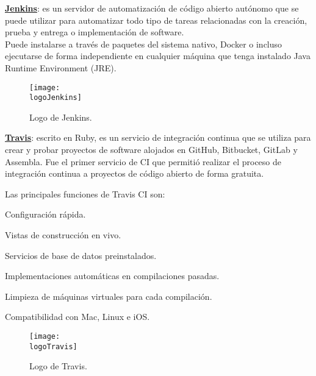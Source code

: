 \begin{compactitem}
    \item \textbf{\underline{Jenkins}}: es un servidor de automatización de código abierto autónomo que se puede utilizar para automatizar todo tipo de tareas relacionadas con la creación, prueba y entrega o implementación de software.\\
    Puede instalarse a través de paquetes del sistema nativo, Docker o incluso ejecutarse de forma independiente en cualquier máquina que tenga instalado Java Runtime Environment (JRE).
    \begin{figure}[h]
        \centering
        \texttt{[image: \\logoJenkins]}
        \caption{Logo de Jenkins.}
    \end{figure}
    \item \textbf{\underline{Travis}}: escrito en Ruby, es un servicio de integración continua que se utiliza para crear y probar proyectos de software alojados en GitHub, Bitbucket, GitLab y Assembla. Fue el primer servicio de CI que permitió realizar el proceso de integración continua a proyectos de código abierto de forma gratuita.
    
    Las principales funciones de Travis CI son:
    \begin{compactitem}
        \item Configuración rápida.
        \item Vistas de construcción en vivo.
        \item Servicios de base de datos preinstalados.
        \item Implementaciones automáticas en compilaciones pasadas.
        \item Limpieza de máquinas virtuales para cada compilación.
        \item Compatibilidad con Mac, Linux e iOS.
    \end{compactitem}

    \begin{figure}[h]
        \centering
        \texttt{[image: \\logoTravis]}
        \caption{Logo de Travis.}
    \end{figure}


\end{compactitem}
